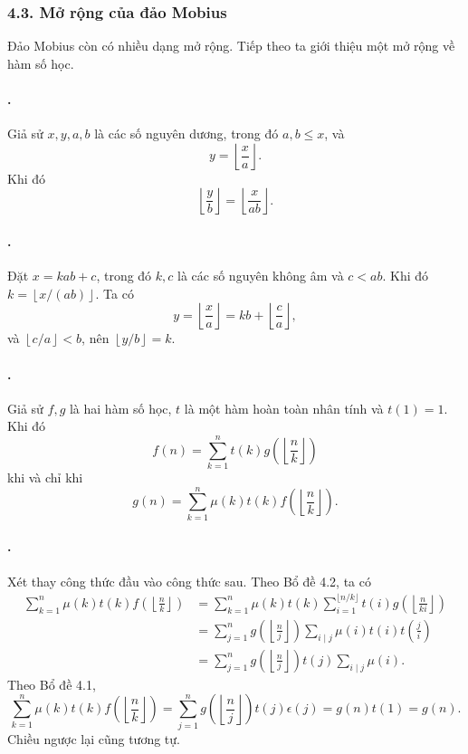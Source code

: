 \documentclass[11pt]{article}
\begin{document}
\subsubsection*{4.3. Mở rộng của đảo Mobius}

Đảo Mobius còn có nhiều dạng mở rộng. Tiếp theo ta giới thiệu một mở rộng về
hàm số học.

\paragraph{.}
Giả sử \(x,y,a,b\) là các số nguyên dương, trong đó \(a,b\le x\), và
\[
  y=\left\lfloor\frac{x}{a}\right\rfloor.
\]
Khi đó
\[
  \left\lfloor\frac{y}{b}\right\rfloor
  = \left\lfloor\frac{x}{ab}\right\rfloor.
\]

\paragraph{.}
Đặt \(x=kab+c\), trong đó \(k,c\) là các số nguyên không âm và \(c<ab\). Khi
đó \(k=\left\lfloor x/(ab)\right\rfloor\). Ta có
\[
  y=\left\lfloor\frac{x}{a}\right\rfloor
  = kb+\left\lfloor\frac{c}{a}\right\rfloor,
\]
và \(\left\lfloor c/a\right\rfloor<b\), nên
\(\left\lfloor y/b\right\rfloor=k\).

\paragraph{.}
Giả sử \(f,g\) là hai hàm số học, \(t\) là một hàm hoàn toàn nhân tính và
\(t(1)=1\). Khi đó
\[
  f(n)=\sum_{k=1}^{n} t(k)g\left(\left\lfloor\frac{n}{k}\right\rfloor\right)
\]
khi và chỉ khi
\[
  g(n)=\sum_{k=1}^{n}\mu(k)t(k)
  f\left(\left\lfloor\frac{n}{k}\right\rfloor\right).
\]

\paragraph{.}
Xét thay công thức đầu vào công thức sau. Theo Bổ đề 4.2, ta có
\[
\begin{aligned}
  \sum_{k=1}^{n}\mu(k)t(k)
  f\left(\left\lfloor\frac{n}{k}\right\rfloor\right)
  &=
  \sum_{k=1}^{n}\mu(k)t(k)
  \sum_{i=1}^{\lfloor n/k\rfloor}
  t(i)g\left(\left\lfloor\frac{n}{ki}\right\rfloor\right)\\
  &=
  \sum_{j=1}^{n}
  g\left(\left\lfloor\frac{n}{j}\right\rfloor\right)
  \sum_{i\mid j}\mu(i)t(i)t\left(\frac{j}{i}\right)\\
  &=
  \sum_{j=1}^{n}
  g\left(\left\lfloor\frac{n}{j}\right\rfloor\right)
  t(j)\sum_{i\mid j}\mu(i).
\end{aligned}
\]
Theo Bổ đề 4.1,
\[
  \sum_{k=1}^{n}\mu(k)t(k)
  f\left(\left\lfloor\frac{n}{k}\right\rfloor\right)
  =
  \sum_{j=1}^{n}
  g\left(\left\lfloor\frac{n}{j}\right\rfloor\right)t(j)\epsilon(j)
  =g(n)t(1)=g(n).
\]
Chiều ngược lại cũng tương tự.
\end{document}
